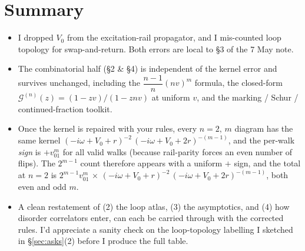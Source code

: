 \documentclass[11pt,a4paper]{article}
\begin{document}
\section{Summary}

\begin{itemize}[leftmargin=2em,itemsep=2pt]
\item I dropped $V_{0}$ from the excitation-rail propagator, and I
mis-counted loop topology for swap-and-return. Both errors are local to
\S 3 of the 7 May note.
\item The combinatorial half (\S 2 \& \S 4) is independent of the kernel
error and survives unchanged, including the $\dfrac{n-1}{n}(nv)^{m}$
formula, the closed-form $\mathcal G^{(n)}(z)=(1-zv)/(1-znv)$ at uniform
$v$, and the marking / Schur / continued-fraction toolkit.
\item Once the kernel is repaired with your rules, every $n{=}2,\,m$
diagram has the same kernel
$(-i\omega+V_{0}+r)^{-2}\,(-i\omega+V_{0}+2r)^{-(m-1)}$, and the per-walk \emph{sign}
is $+v_{01}^{m}$ for all valid walks (because rail-parity forces an
even number of flips). The $2^{m-1}$ count therefore appears with a
uniform $+$ sign, and the total at $n{=}2$ is
$2^{m-1}v_{01}^{m}\,\times\,(-i\omega+V_{0}+r)^{-2}\,(-i\omega+V_{0}+2r)^{-(m-1)}$, both
even and odd $m$.
\item A clean restatement of (2) the loop atlas, (3) the asymptotics,
and (4) how disorder correlators enter, can each be carried through with
the corrected rules. I'd appreciate a sanity check on the loop-topology
labelling I sketched in \S\ref{sec:asks}(2) before I produce the full
table.
\end{itemize}
\end{document}
